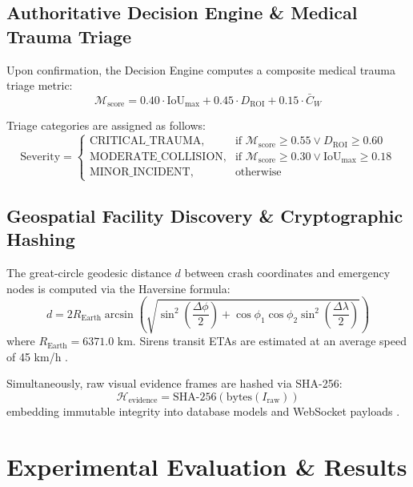 \documentclass[conference]{IEEEtran}
\begin{document}
\subsection{Authoritative Decision Engine \& Medical Trauma Triage}
Upon confirmation, the Decision Engine computes a composite medical trauma triage metric:
\begin{equation}
    \mathcal{M}_{\text{score}} = 0.40 \cdot \text{IoU}_{\max} + 0.45 \cdot D_{\text{ROI}} + 0.15 \cdot \bar{C}_W
\end{equation}

Triage categories are assigned as follows:
\begin{equation}
    \text{Severity} = \begin{cases}
    \text{CRITICAL\_TRAUMA}, & \text{if } \mathcal{M}_{\text{score}} \ge 0.55 \lor D_{\text{ROI}} \ge 0.60 \\
    \text{MODERATE\_COLLISION}, & \text{if } \mathcal{M}_{\text{score}} \ge 0.30 \lor \text{IoU}_{\max} \ge 0.18 \\
    \text{MINOR\_INCIDENT}, & \text{otherwise}
    \end{cases}
\end{equation}

\subsection{Geospatial Facility Discovery \& Cryptographic Hashing}
The great-circle geodesic distance $d$ between crash coordinates and emergency nodes is computed via the Haversine formula:
\begin{equation}
    d = 2 R_{\text{Earth}} \arcsin\left(\sqrt{\sin^2\left(\frac{\Delta\phi}{2}\right) + \cos\phi_1\cos\phi_2\sin^2\left(\frac{\Delta\lambda}{2}\right)}\right)
\end{equation}
where $R_{\text{Earth}} = 6371.0\text{ km}$. Sirens transit ETAs are estimated at an average speed of 45 km/h \cite{sinnott2019haversine}.

Simultaneously, raw visual evidence frames are hashed via SHA-256:
\begin{equation}
    \mathcal{H}_{\text{evidence}} = \text{SHA-256}\left(\text{bytes}(I_{\text{raw}})\right)
\end{equation}
embedding immutable integrity into database models and WebSocket payloads \cite{nist2015fips}.

\section{Experimental Evaluation \& Results}
\end{document}
